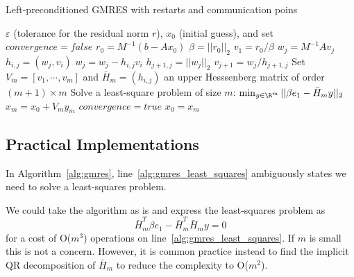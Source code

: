\documentclass[10pt]{article}
\begin{document}
\begin{algorithm}                      %
\caption{Left-preconditioned GMRES with restarts and {\color{red} communication poins} }          %
\label{alg:gmres_comm}                           %
\begin{algorithmic}[1]                   %
    \State $\varepsilon$ (tolerance for the residual norm $r$), $x_0$ (initial guess), and set $convergence = false$
    \State $r_0 = M^{-1} (b-Ax_0)$ 	
    \State $\beta = ||r_0||_2$		
    \State $v_1 = r_0 / \beta$
			\State $w_j = M^{-1} A v_j$			 	
				\State $h_{i,j} = (w_j, v_i)$ 				
				\State $w_j = w_j - h_{i,j} v_i$
			\EndFor 
			\State $h_{j+1, j}  = ||w_j||_2$			
			\State $v_{j+1} = w_j / h_{j+1,j}$	
	\EndFor
	\State Set $V_m = [v_1, \cdots, v_m]$ and $\bar{H}_m = (h_{i,j})$ an upper Hesssenberg matrix of order $(m+1)\times m$
	\State Solve a least-square problem of size $m$: $\min_{y \in \R^m} ||\beta e_1 - \bar{H}_m y||_2$
	\State $x_m = x_0 + V_m y_m$
		\State $convergence = true$
	\EndIf
	\State $x_0 = x_m$
    \EndWhile
\end{algorithmic}
\end{algorithm}

\subsection{Practical Implementations}

In Algorithm~\ref{alg:gmres}, line~\ref{alg:gmres_least_squares} ambiguously states we need to solve a least-squares problem. 


We could take the algorithm as is and express the least-squares problem as 
\begin{equation} 
\bar{H}_m^T \beta e_1 - \bar{H}_m^T \bar{H}_m y = 0 \label{eq:least_squares}
\end{equation}
for a cost of O($m^3$) operations on line~\ref{alg:gmres_least_squares}. If $m$ is small this is not a concern. However, it is common practice instead to find the implicit QR decomposition of $\bar{H}_m$ to reduce the complexity to O($m^2$). 
\end{document}
